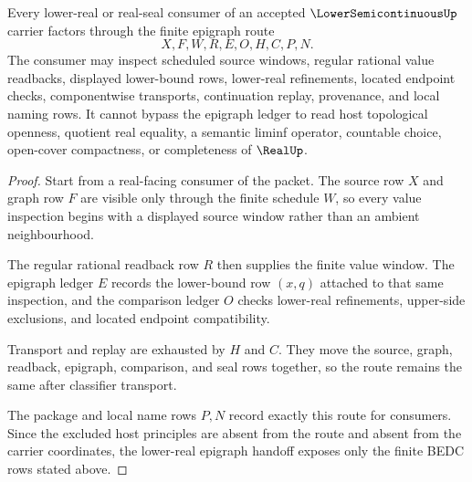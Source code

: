 \begin{theorem}
\label{thm:lower-semicontinuous-lowerreal-epigraph-route}
Every lower-real or real-seal consumer of an accepted
$\LowerSemicontinuousUp$ carrier factors through the finite epigraph route
$$
X,F,W,R,E,O,H,C,P,N .
$$
The consumer may inspect scheduled source windows, regular rational value
readbacks, displayed lower-bound rows, lower-real refinements, located
endpoint checks, componentwise transports, continuation replay, provenance,
and local naming rows. It cannot bypass the epigraph ledger to read host
topological openness, quotient real equality, a semantic liminf operator,
countable choice, open-cover compactness, or completeness of $\RealUp$.
\end{theorem}
\begin{proof}
Start from a real-facing consumer of the packet. The source row $X$ and graph
row $F$ are visible only through the finite schedule $W$, so every value
inspection begins with a displayed source window rather than an ambient
neighbourhood.

The regular rational readback row $R$ then supplies the finite value window.
The epigraph ledger $E$ records the lower-bound row $(x,q)$ attached to that
same inspection, and the comparison ledger $O$ checks lower-real refinements,
upper-side exclusions, and located endpoint compatibility.

Transport and replay are exhausted by $H$ and $C$. They move the source,
graph, readback, epigraph, comparison, and seal rows together, so the route
remains the same after classifier transport.

The package and local name rows $P,N$ record exactly this route for consumers.
Since the excluded host principles are absent from the route and absent from
the carrier coordinates, the lower-real epigraph handoff exposes only the
finite BEDC rows stated above.
\end{proof}

